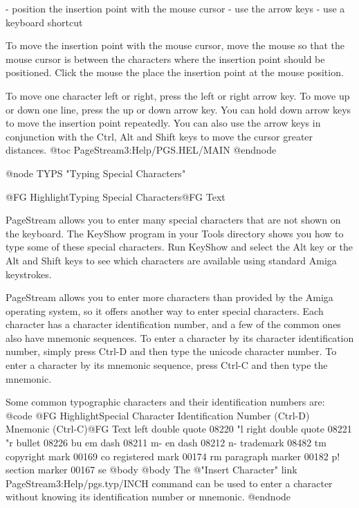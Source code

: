 - position the insertion point with the mouse cursor
- use the arrow keys
- use a keyboard shortcut

To move the insertion point with the mouse cursor, move the mouse so that
the mouse cursor is between the characters where the insertion point
should be positioned. Click the mouse the place the insertion point at
the mouse position.

To move one character left or right, press the left or right arrow key.
To move up or down one line, press the up or down arrow key. You can hold
down arrow keys to move the insertion point repeatedly. You can also use
the arrow keys in conjunction with the Ctrl, Alt and Shift keys to move
the cursor greater distances.
@toc PageStream3:Help/PGS.HEL/MAIN
@endnode

@node TYPS "Typing Special Characters"

@{FG Highlight}Typing Special Characters@{FG Text}

PageStream allows you to enter many special characters that are not shown
on the keyboard. The KeyShow program in your Tools directory shows you
how to type some of these special characters. Run KeyShow and select the
Alt key or the Alt and Shift keys to see which characters are available
using standard Amiga keystrokes.

PageStream allows you to enter more characters than provided by the Amiga
operating system, so it offers another way to enter special characters.
Each character has a character identification number, and a few of the
common ones also have mnemonic sequences. To enter a character by its
character identification number, simply press Ctrl-D and then type the
unicode character number. To enter a character by its mnemonic sequence,
press Ctrl-C and then type the mnemonic.

Some common typographic characters and their identification numbers are:
@{code}
@{FG Highlight}Special Character   Identification Number (Ctrl-D)  Mnemonic (Ctrl-C)@{FG Text}
left double quote   08220                           "l
right double quote  08221                           "r
bullet              08226                           bu
em dash             08211                           m-
en dash             08212                           n-
trademark           08482                           tm
copyright mark      00169                           co
registered mark     00174                           rm
paragraph marker    00182                           p!
section marker      00167                           se
@{body}
@{body}
The @{"Insert Character" link PageStream3:Help/pgs.typ/INCH} command can be used to enter a character without
knowing its identification number or mnemonic.
@endnode


